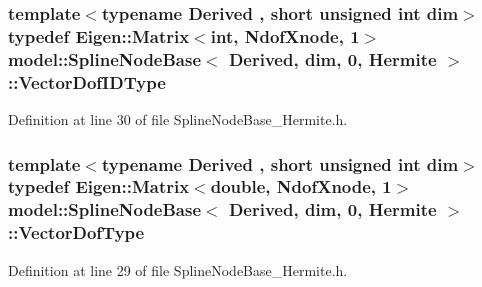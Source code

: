 \subsubsection[{Vector\+Dof\+I\+D\+Type}]{\setlength{\rightskip}{0pt plus 5cm}template$<$typename Derived , short unsigned int dim$>$ typedef Eigen\+::\+Matrix$<$int, {\bf Ndof\+Xnode}, 1$>$ {\bf model\+::\+Spline\+Node\+Base}$<$ Derived, {\bf dim}, 0, {\bf Hermite} $>$\+::{\bf Vector\+Dof\+I\+D\+Type}}\label{classmodel_1_1_spline_node_base_3_01_derived_00_01dim_00_010_00_01_hermite_01_4_af7807f7969fece6222d6376110a1c904}


Definition at line 30 of file Spline\+Node\+Base\+\_\+\+Hermite.\+h.

\hypertarget{classmodel_1_1_spline_node_base_3_01_derived_00_01dim_00_010_00_01_hermite_01_4_a80bc9eddf53243e072ed19e68412d939}{}
\subsubsection[{Vector\+Dof\+Type}]{\setlength{\rightskip}{0pt plus 5cm}template$<$typename Derived , short unsigned int dim$>$ typedef Eigen\+::\+Matrix$<$double, {\bf Ndof\+Xnode}, 1$>$ {\bf model\+::\+Spline\+Node\+Base}$<$ Derived, {\bf dim}, 0, {\bf Hermite} $>$\+::{\bf Vector\+Dof\+Type}}\label{classmodel_1_1_spline_node_base_3_01_derived_00_01dim_00_010_00_01_hermite_01_4_a80bc9eddf53243e072ed19e68412d939}


Definition at line 29 of file Spline\+Node\+Base\+\_\+\+Hermite.\+h.



